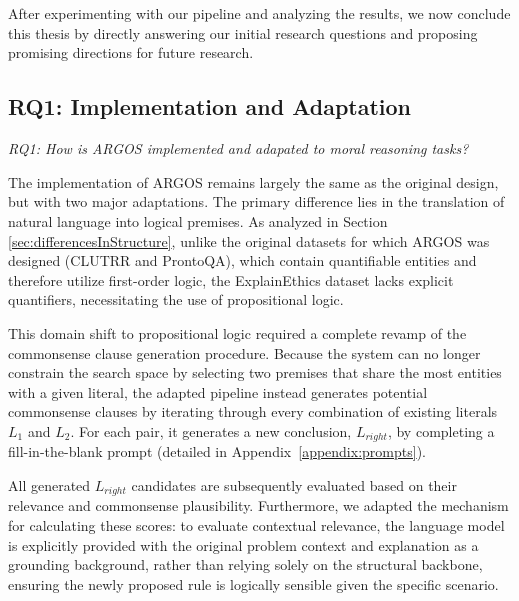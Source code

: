 \chapter{\kesimpulan}
\label{bab:6}

After experimenting with our pipeline and analyzing the results, we now conclude this thesis by directly answering our initial research questions and proposing promising directions for future research.

\section{RQ1: Implementation and Adaptation}
\label{sec:conclusionRq1}

\textit{RQ1: How is ARGOS implemented and adapated to moral reasoning tasks?}

The implementation of ARGOS remains largely the same as the original design, but with two major adaptations. The primary difference lies in the translation of natural language into logical premises. As analyzed in Section \ref{sec:differencesInStructure}, unlike the original datasets for which ARGOS was designed (CLUTRR and ProntoQA),     which contain quantifiable entities and therefore utilize first-order logic, the ExplainEthics dataset lacks explicit quantifiers, necessitating the use of propositional logic. 

This domain shift to propositional logic required a complete revamp of the commonsense clause generation procedure. Because the system can no longer constrain the search space by selecting two premises that share the most entities with a given literal, the adapted pipeline instead generates potential commonsense clauses by iterating through every combination of existing literals $L_1$ and $L_2$. For each pair, it generates a new conclusion, $L_{right}$, by completing a fill-in-the-blank prompt (detailed in Appendix~\ref{appendix:prompts}). 

All generated $L_{right}$ candidates are subsequently evaluated based on their relevance and commonsense plausibility. Furthermore, we adapted the mechanism for calculating these scores: to evaluate contextual relevance, the language model is explicitly provided with the original problem context and explanation as a grounding background, rather than relying solely on the structural backbone, ensuring the newly proposed rule is logically sensible given the specific scenario.

